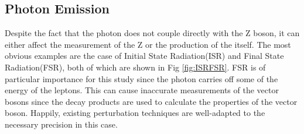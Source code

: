 \subsection{Photon Emission}
\label{sec:StateRad}
Despite the fact that the photon does not couple directly with the Z boson, it can either affect the measurement of the Z or the production of the \Z itself. The most obvious examples are the case of Initial State Radiation(ISR) and Final State Radiation(FSR), both of which are shown in Fig \ref{fig:ISRFSR}. FSR is of particular importance for this study since the photon carries off some of the energy of the leptons. This can cause inaccurate measurements of the vector bosons \bosonpt since the decay products are used to calculate the properties of the vector boson. Happily, existing perturbation techniques are well-adapted to the necessary precision in this case.




%

 
